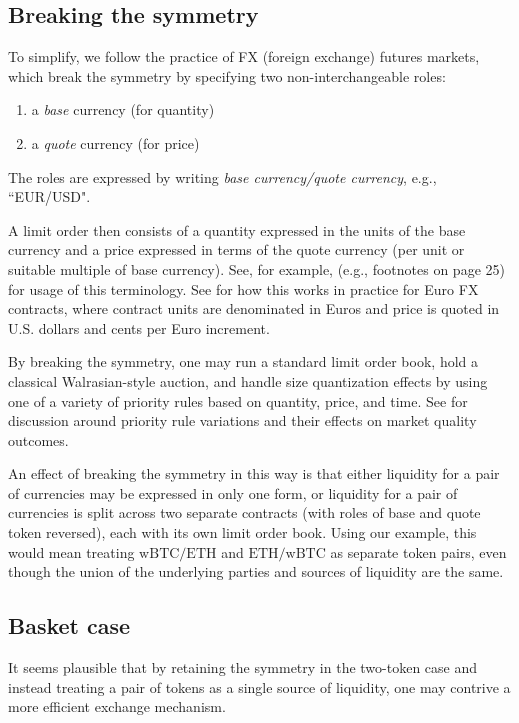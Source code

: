 \documentclass[11pt, reqno]{amsart}
\newcommand{\BTC}{\mathrm{wBTC}}
\newcommand{\ETH}{\mathrm{ETH}}
\begin{document}
\subsection{Breaking the symmetry}
To simplify, we follow the practice of FX (foreign exchange) futures markets,
which break the symmetry by specifying two non-interchangeable roles:
\begin{enumerate}
	\item a \emph{base} currency (for quantity)
	\item a \emph{quote} currency (for price)
\end{enumerate}
The roles are expressed by writing \emph{base currency/quote currency}, e.g.,
``EUR/USD".

A limit order then consists of a quantity expressed in the units of the base
currency and a price expressed in terms of the quote currency (per unit or
suitable multiple of base currency). See, for example, \cite{Cme23} (e.g.,
footnotes on page 25) for usage of this terminology. See \cite{CmeFx} for how
this works in practice for Euro FX contracts, where contract units are
denominated in Euros and price is quoted in U.S. dollars and cents per Euro
increment.

By breaking the symmetry, one may run a standard limit order book, hold a
classical Walrasian-style auction, and handle size quantization effects by
using one of a variety of priority rules based on quantity, price, and time.
See \cite{BeLaLiVa22} for discussion around priority rule variations and their
effects on market quality outcomes.

An effect of breaking the symmetry in this way is that either liquidity for a
pair of currencies may be expressed in only one form, or liquidity for a pair
of currencies is split across two separate contracts (with roles of base and
quote token reversed), each with its own limit order book.
Using our example, this would mean treating $\BTC/\ETH$ and $\ETH/\BTC$ as
separate token pairs, even though the union of the underlying parties and
sources of liquidity are the same.

\subsection{Basket case}
It seems plausible that by retaining the symmetry in the two-token case and
instead treating a pair of tokens as a single source of liquidity, one may
contrive a more efficient exchange mechanism.
\end{document}
